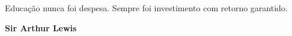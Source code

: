Educação nunca foi despesa. Sempre foi investimento com retorno garantido.

\bigskip

\textbf{Sir Arthur Lewis}
